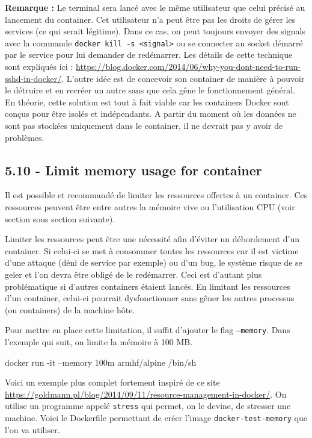 \documentclass[11pt,a4paper,oneside]{report}
\newcommand{\code}[1]{\texttt{#1}}
\begin{document}
\textbf{Remarque : } Le terminal sera lancé avec le même utilisateur que celui précisé au lancement du container. Cet utilisateur n'a peut être pas les droits de gérer les services (ce qui serait légitime). Dans ce cas, on peut toujours envoyer des signals avec la commande \code{docker kill -s <signal>} ou se connecter au socket démarré par le service pour lui demander de redémarrer. Les détails de cette technique sont expliqués ici : \url{https://blog.docker.com/2014/06/why-you-dont-need-to-run-sshd-in-docker/}. L'autre idée est de concevoir son container de manière à pouvoir le détruire et en recréer un autre sans que cela gêne le fonctionnement général. En théorie, cette solution est tout à fait viable car les containers Docker sont conçus pour être isolés et indépendants. A partir du moment où les données ne sont pas stockées uniquement dans le container, il ne devrait pas y avoir de problèmes.

\subsection{5.10 - Limit memory usage for container}
Il est possible et recommandé de limiter les ressources offertes à un container. Ces ressources peuvent être entre autres la mémoire vive ou l'utilisation CPU (voir section sous section suivante).

Limiter les ressources peut être une nécessité afin d'éviter un débordement d'un container. Si celui-ci se met à consommer toutes les ressources car il est victime d'une attaque (déni de service par exemple) ou d'un bug, le système risque de se geler et l'on devra être obligé de le redémarrer. Ceci est d'autant plus problématique si d'autres containers étaient lancés. En limitant les ressources d'un container, celui-ci pourrait dysfonctionner sans gêner les autres processus (ou containers) de la machine hôte.

Pour mettre en place cette limitation, il suffit d'ajouter le flag \code{--memory}. Dans l'exemple qui suit, on limite la mémoire à 100 MB.

\begin{bashcode}
docker run -it --memory 100m armhf/alpine /bin/sh
\end{bashcode}

Voici un exemple plus complet fortement inspiré de ce site \url{https://goldmann.pl/blog/2014/09/11/resource-management-in-docker/}. On utilise un programme appelé \code{stress} qui permet, on le devine, de stresser une machine. Voici le Dockerfile permettant de créer l'image \code{docker-test-memory} que l'on va utiliser.
\end{document}
